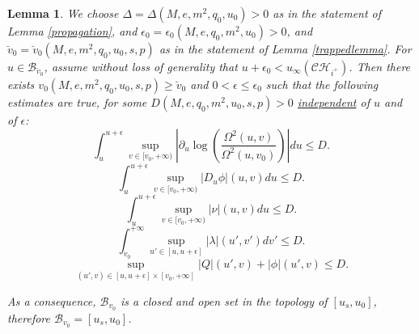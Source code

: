 \documentclass[10pt,a4paper]{article}
\theoremstyle{plain}
\newtheorem{lem}[thm]{Lemma}
\theoremstyle{remark}
\theoremstyle{definition}
\theoremstyle{plain}
\theoremstyle{remark}
\theoremstyle{definition}
\newcommand{\CH}{\mathcal{CH}_{i^+}}
\numberwithin{equation}{section}
\begin{document}
\begin{lem} \label{finitevolumeestlemma} We choose $\Delta=\Delta(M,e,m^2,q_0,u_0)>0$ as in the statement of Lemma \ref{propagation}, and $\epsilon_0=\epsilon_0(M,e,q_0,m^2,u_0)>0$, and  $\breve{v}_0=\breve{v}_0(M,e,m^2,q_0,u_0,s,p)$ as in the statement of Lemma \ref{trappedlemma}. For $u\in \mathcal{B}_{\breve{v}_0}$, assume without loss of generality that $u+\epsilon_0 < u_{\infty}(\CH)$. 
	Then there exists $v_0(M,e,m^2,q_0,u_0,s,p)\geq \breve{v}_0$  and $0<\epsilon \leq \epsilon_0$ such that the following estimates are true, for some $D(M,e,q_0,m^2,u_0,s,p)>0$ \underline{independent} of $u$ and of $\epsilon$: \begin{equation} \label{dulogomegaL1}
	\int_{u}^{u+\epsilon} \sup_{v \in [v_0,+\infty)} |\partial_u \log( \frac{\Omega^2(u,v)}{\Omega^2(u,v_0)})|du  \leq D.
	\end{equation} 	\begin{equation} \label{duphiL1}
	\int_{u}^{u+\epsilon} \sup_{v \in [v_0,+\infty)} |D_u \phi|(u,v)du  \leq D.
	\end{equation} 	\begin{equation} \label{durL1}
	\int_{u}^{u+\epsilon} \sup_{v \in [v_0,+\infty)} |\nu|(u,v)du  \leq D.
	\end{equation} 	\begin{equation} \label{dvrL1}
	\int_{v_0}^{+\infty} \sup_{u' \in [u,u+\epsilon]} |\lambda|(u',v') dv' \leq D.
	\end{equation} 	\begin{equation} \label{phiQrLinfty}
	\sup_{(u',v) \in [u,u+\epsilon] \times [v_0,+\infty]} |Q|(u',v)+ |\phi|(u',v) \leq D.
	\end{equation}
	
	As a consequence, $\mathcal{B}_{v_0}$ is a closed and open set in the topology of $[u_s,u_0]$, therefore  $\mathcal{B}_{v_0}=[u_s,u_0]$. %
\end{lem}
\end{document}

